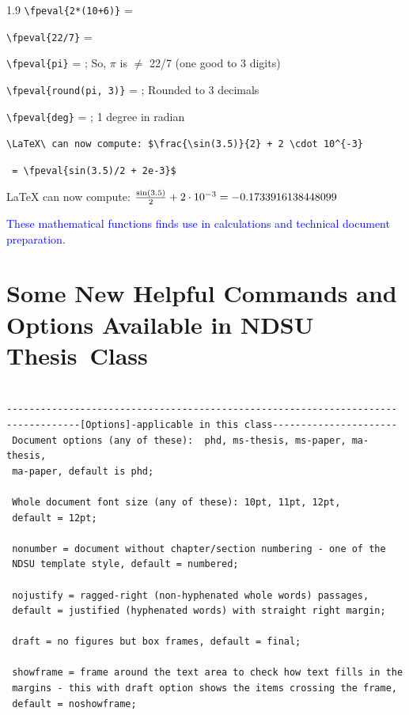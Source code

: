 \documentclass[phd]{ndsu-thesis-2022}
\newcommand\myspacing{1.9}      %
\newcommand\italk[1]{\textcolor{blue}{#1}}  %
\newcommand\lx{\LaTeX\xspace}
\begin{document}
\begin{spacing}{\myspacing}
\verb|\fpeval{2*(10+6)}| = 
   
\verb|\fpeval{22/7}| = 

\verb|\fpeval{pi}| = ; \hspace{0.15in} So, $\pi$ is $\neq$ 22/7 (one good to 3 digits)

\verb|\fpeval{round(pi, 3)}| = ; \hspace{0.15in} Rounded to 3 decimals

\verb+\fpeval{deg}+ = ; \hspace{0.15in} 1 degree in radian

\verb|\LaTeX\ can now compute: $\frac{\sin(3.5)}{2} + 2 \cdot 10^{-3}| 

\verb| = \fpeval{sin(3.5)/2 + 2e-3}$|

\lx can now compute: $\frac{\sin(3.5)}{2} + 2 \cdot 10^{-3} = \fpeval{sin(3.5)/2 + 2e-3}$

\italk{These mathematical functions finds use in calculations and technical document preparation.}

\section{Some New Helpful Commands and Options Available in NDSU Thesis~Class}

\begin{lstlisting}[basicstyle=\ttfamily\footnotesize\color{blue}] %or \small or \footnotesize etc.

---------------------------------------------------------------------
-------------[Options]-applicable in this class----------------------
 Document options (any of these):  phd, ms-thesis, ms-paper, ma-thesis, 
 ma-paper, default is phd; 
 
 Whole document font size (any of these): 10pt, 11pt, 12pt, 
 default = 12pt; 
 
 nonumber = document without chapter/section numbering - one of the 
 NDSU template style, default = numbered; 
 
 nojustify = ragged-right (non-hyphenated whole words) passages, 
 default = justified (hyphenated words) with straight right margin; 
 
 draft = no figures but box frames, default = final; 
 
 showframe = frame around the text area to check how text fills in the 
 margins - this with draft option shows the items crossing the frame, 
 default = noshowframe; 
 

\end{lstlisting}
\end{spacing}
\end{document}
